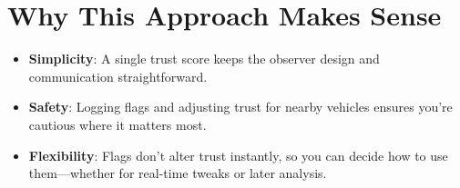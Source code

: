 \documentclass{article}
\begin{document}
\section{Why This Approach Makes Sense}
\begin{itemize}
    \item \textbf{Simplicity}: A single trust score keeps the observer design and communication straightforward.
    \item \textbf{Safety}: Logging flags and adjusting trust for nearby vehicles ensures you're cautious where it matters most.
    \item \textbf{Flexibility}: Flags don't alter trust instantly, so you can decide how to use them—whether for real-time tweaks or later analysis.
\end{itemize}
\end{document}
